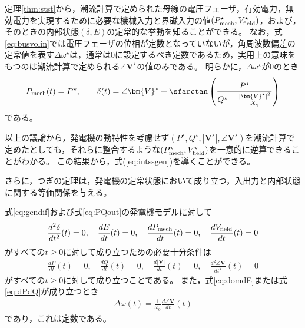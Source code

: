 \documentclass[tombow,dvipdfmx]{corona-a5-1.1}
\begin{document}
定理\ref{thm:stst}から，潮流計算で定められた母線の電圧フェーザ，有効電力，無効電力を実現するために必要な機械入力と界磁入力の値$(P_{\rm mech}^{\star},V_{\rm field}^{\star})$，および，そのときの内部状態$(\delta,E)$の定常的な挙動を知ることができる。
なお，式\ref{eq:busvolin}では電圧フェーザの位相が定数となっていないが，角周波数偏差の定常値を表す$\Delta \omega^{\star}$は，通常は0に設定するべき定数であるため，実用上の意味をもつのは潮流計算で定められる$\angle \bm{V}^{\star}$の値のみである。
明らかに，$\Delta \omega^{\star}$が0のとき
\begin{align*}
P_{{\rm mech}}(t) =    P^{\star},\qquad
\delta (t)  = \angle \bm{V}^{\star}
+ \sfarctan \left( \frac{P^{\star}}{Q^{\star} + \tfrac{ |\bm{V}^{\star}|^2}{X_{\rm q}} } \right)
\end{align*}
である。

以上の議論から，発電機の動特性を考慮せず$(P^{\star},Q^{\star},|\bm{V}^{\star}|,\angle \bm{V}^{\star})$を潮流計算で定めたとしても，それらに整合するような$(P_{\rm mech}^{\star},V_{\rm field}^{\star})$を一意的に逆算できることがわかる。
この結果から，式(\ref{eq:intssgen})を導くことができる。

さらに，つぎの定理は，発電機の定常状態において成り立つ，入出力と内部状態に関する等価関係を与える。

\begin{定理}[発電機の入出力と内部状態に関する等価関係]
\label{thm:outst}
式\ref{eq:gendif}および式\ref{eq:PQout}の発電機モデルに対して
\begin{align}\label{eq:domdE}
\frac{d^2 \delta}{dt^2}(t)=0
,\quad
\frac{dE}{dt}(t)=0
,\quad
\frac{d P_{\rm mech}}{dt}(t)=0
,\quad
\frac{d V_{\rm field}}{dt}(t)=0
\end{align}
がすべての$t\geq0$に対して成り立つための必要十分条件は
\begin{align}\label{eq:dPdQ}
\frac{dP}{dt}(t)=0
,\quad
\frac{dQ}{dt}(t)=0
,\quad
\frac{d|\bm{V}|}{dt}(t)=0
,\quad
\frac{d^2 \angle \bm{V}}{dt^2}(t)=0
\end{align}
がすべての$t\geq0$に対して成り立つことである。
また，式\ref{eq:domdE}または式\ref{eq:dPdQ}が成り立つとき
\begin{align}\label{eq:frer}
\Delta \omega(t)= \frac{1}{\omega_0}\frac{d \angle \bm{V}}{dt}(t)
\end{align}
であり，これは定数である。
\end{定理}
\end{document}
